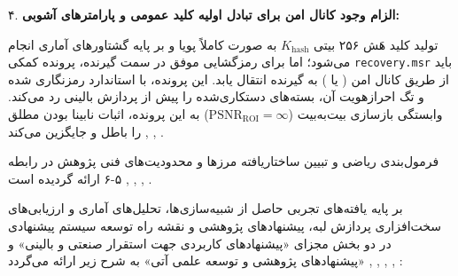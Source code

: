 

۴. \textbf{الزام وجود کانال امن برای تبادل اولیه کلید عمومی و پارامترهای آشوبی:}\par

تولید کلید هَش ۲۵۶ بیتی $K_{\mathrm{hash}}$ به صورت کاملاً پویا و بر پایه گشتاورهای آماری  انجام می‌شود؛ اما برای رمزگشایی موفق در سمت گیرنده، پرونده کمکی \texttt{recovery.msr} باید از طریق کانال امن ( یا ) به گیرنده انتقال یابد. این پرونده، با استاندارد  رمزنگاری شده و تگ احرازهویت آن، بسته‌های دستکاری‌شده را پیش از پردازش بالینی رد می‌کند. وابستگی بازسازی بیت‌به‌بیت ($\mathrm{PSNR}_{\mathrm{ROI}} = \infty$) به این پرونده، اثبات نابینا بودن مطلق را باطل و جایگزین می‌کند , , .\par



فرمول‌بندی ریاضی و تبیین ساختاریافته مرزها و محدودیت‌های فنی پژوهش در رابطه ۵{-}۶ ارائه گردیده است , , , .\par








بر پایه یافته‌های تجربی حاصل از شبیه‌سازی‌ها، تحلیل‌های آماری و ارزیابی‌های سخت‌افزاری پردازش لبه، پیشنهادهای پژوهشی و نقشه راه توسعه سیستم پیشنهادی در دو بخش مجزای «پیشنهادهای کاربردی جهت استقرار صنعتی و بالینی» و «پیشنهادهای پژوهشی و توسعه علمی آتی» به شرح زیر ارائه می‌گردد , , , , :\par

